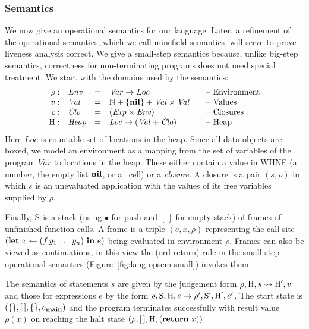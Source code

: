 \subsubsection{Semantics}
We now give an operational
semantics for  our language.  Later, a refinement of
the  operational semantics,  which we  call minefield  semantics, will
serve to prove liveness analysis correct.
We give a small-step semantics because, unlike big-step semantics,
correctness for non-terminating programs does not need special treatment.
We start with the domains used by the semantics:
\[
\begin{array}{rlcl@{\hspace{2em}}l}
\rho: & \mathit{Env} &=&\mathit{Var} \rightarrow {Loc} & \mbox{-- Environment} \\ 
v:   & \mathit{Val} &=& \mathbb{N} + \{\NIL\} + \mathit{Val \times
  Val}& \mbox{-- Values}\\
c:   & \mathit{Clo} &=& \mathit{(Exp \times Env)}& \mbox{-- Closures}\\
\heap: & \mathit{Heap} & =&\mathit{Loc} \rightarrow (\mathit{Val} +
\mathit{Clo}) & \mbox{-- Heap}
\end{array}
\]
Here $\mathit{Loc}$ is countable set  of locations in the heap.  Since
all data objects are boxed, we  model an environment as a mapping from
the set of variables of the program $\mathit{Var}$ to locations in the
heap.  These either contain a value  in WHNF (a number, the empty list
$\mbox{$\mathbf{ nil}$}$, or  a \CONS\ cell)  or a {\em  closure}.  A closure is  a pair
$(s, \rho)$ in which $s$ is an unevaluated application with the values
of its free variables supplied by $\rho$.

Finally, $\mbox{S}$  is a stack (using  $\bullet$ for push  and $[\,]$ for
empty stack)  of frames  of unfinished function  calls.  A frame  is a
triple  $(e,x,\rho)$   representing  the  call  site   $  (\mbox{$\mathbf{ let}$}\,\,  x
\leftarrow (f\,y_1\,\ldots\,y_n) \,\, \mbox{$\mathbf{ in}$}\,\,  e) $ being evaluated in
environment $\rho$.   Frames can also  be viewed as  continuations, in
this view  the ({\sc ord-return})  rule in the  small-step operational
semantics (Figure~\ref{fig:lang-opsem-small}) invokes them.

The semantics of statements $s$ are given by the judgement form $\rho,
\mbox{H}, s \rightsquigarrow \mbox{H}', v$  and those for expressions $e$ by
the form $\rho, \mbox{S}, \mbox{H},  e \rightarrow \rho', \mbox{S}', \mbox{H}', e'$.
The  start state is  $(\{\},[\,], \{\},  e_{\mathbf{main}})$ and  the program
terminates successfully  with result  value $\rho(x)$ on  reaching the
halt state $(\rho,[\,], \mbox{H}, (\mbox{$\mathbf{ return}$}\ x))$

